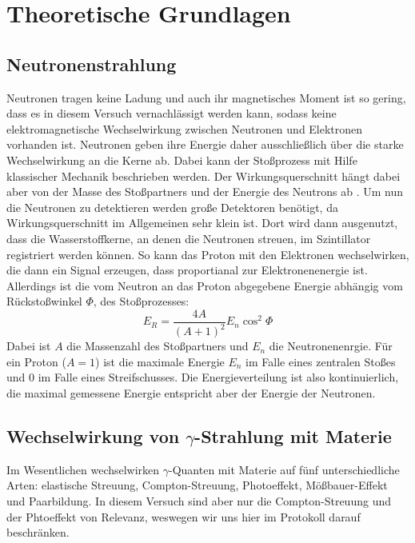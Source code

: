 \section{Theoretische Grundlagen}

\subsection{Neutronenstrahlung}
Neutronen tragen keine Ladung und auch ihr magnetisches Moment ist so gering, dass es in diesem Versuch vernachlässigt werden kann, sodass keine elektromagnetische Wechselwirkung zwischen Neutronen und Elektronen vorhanden ist. Neutronen geben ihre Energie daher ausschließlich über die starke Wechselwirkung an die Kerne ab. Dabei kann der Stoßprozess mit Hilfe  klassischer Mechanik beschrieben werden. Der Wirkungsquerschnitt hängt  dabei aber von der Masse des Stoßpartners und der Energie des Neutrons ab \cite{anleitung}.
Um nun die Neutronen zu detektieren werden große Detektoren benötigt, da Wirkungsquerschnitt im Allgemeinen sehr klein ist. Dort wird dann ausgenutzt, dass die Wasserstoffkerne, an denen die Neutronen streuen, im Szintillator registriert werden können. So kann das Proton mit den Elektronen wechselwirken, die dann ein Signal erzeugen, dass proportianal zur Elektronenenergie ist. Allerdings ist die vom Neutron an das Proton abgegebene Energie abhängig vom Rückstoßwinkel $\Phi$, des Stoßprozesses:
\begin{equation}
 E_R = \frac{4A}{(A+1)^2}E_n\cos^2\Phi
\end{equation}
Dabei ist $A$ die Massenzahl des Stoßpartners und $E_n$ die Neutronenenrgie. Für ein Proton ($A=1$) ist die maximale Energie $E_n$ im Falle eines zentralen Stoßes und $0$ im Falle eines Streifschusses. Die Energieverteilung ist also kontinuierlich, die maximal gemessene Energie entspricht aber der Energie der Neutronen.

\subsection{Wechselwirkung von $\gamma$-Strahlung mit Materie}
Im Wesentlichen wechselwirken $\gamma$-Quanten mit Materie auf fünf unterschiedliche Arten: elastische Streuung, Compton-Streuung, Photoeffekt, Mößbauer-Effekt und Paarbildung. In diesem Versuch sind aber nur die Compton-Streuung und der Phtoeffekt von Relevanz, weswegen wir uns hier im Protokoll darauf beschränken.
